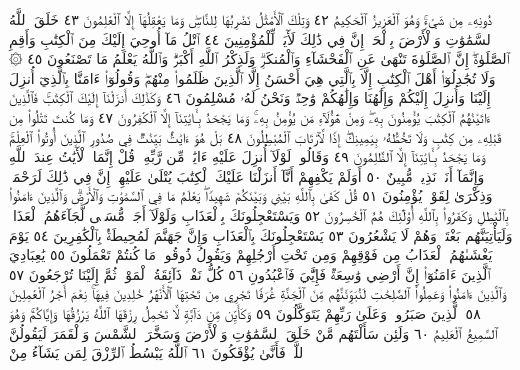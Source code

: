 دُونِهِۦ مِن شَيْءࣲۚ وَهُوَ ٱلْعَزِيزُ ٱلْحَكِيمُ ٤٢ وَتِلْكَ
ٱلْأَمْثَٰلُ نَضْرِبُهَا لِلنَّاسِۖ وَمَا يَعْقِلُهَآ إِلَّا ٱلْعَٰلِمُونَ ٤٣
خَلَقَ ٱللَّهُ ٱلسَّمَٰوَٰتِ وَٱلْأَرْضَ بِٱلْحَقِّۚ إِنَّ فِي ذَٰلِكَ
لَأٓيَةࣰ لِّلْمُؤْمِنِينَ ٤٤ ٱتْلُ مَآ أُوحِيَ إِلَيْكَ مِنَ ٱلْكِتَٰبِ
وَأَقِمِ ٱلصَّلَوٰةَۖ إِنَّ ٱلصَّلَوٰةَ تَنْهَىٰ عَنِ ٱلْفَحْشَآءِ
وَٱلْمُنكَرِۗ وَلَذِكْرُ ٱللَّهِ أَكْبَرُۗ وَٱللَّهُ يَعْلَمُ مَا تَصْنَعُونَ ٤٥
۞ وَلَا تُجَٰدِلُوٓا۟ أَهْلَ ٱلْكِتَٰبِ إِلَّا بِٱلَّتِي هِيَ أَحْسَنُ إِلَّا
ٱلَّذِينَ ظَلَمُوا۟ مِنْهُمْۖ وَقُولُوٓا۟ ءَامَنَّا بِٱلَّذِيٓ أُنزِلَ إِلَيْنَا وَأُنزِلَ
إِلَيْكُمْ وَإِلَٰهُنَا وَإِلَٰهُكُمْ وَٰحِدࣱ وَنَحْنُ لَهُۥ مُسْلِمُونَ ٤٦
وَكَذَٰلِكَ أَنزَلْنَآ إِلَيْكَ ٱلْكِتَٰبَۚ فَٱلَّذِينَ ءَاتَيْنَٰهُمُ
ٱلْكِتَٰبَ يُؤْمِنُونَ بِهِۦۖ وَمِنْ هَٰٓؤُلَآءِ مَن يُؤْمِنُ بِهِۦۚ وَمَا
يَجْحَدُ بِـَٔايَٰتِنَآ إِلَّا ٱلْكَٰفِرُونَ ٤٧ وَمَا كُنتَ تَتْلُوا۟ مِن
قَبْلِهِۦ مِن كِتَٰبࣲ وَلَا تَخُطُّهُۥ بِيَمِينِكَۖ إِذࣰا لَّٱرْتَابَ
ٱلْمُبْطِلُونَ ٤٨ بَلْ هُوَ ءَايَٰتُۢ بَيِّنَٰتࣱ فِي صُدُورِ ٱلَّذِينَ
أُوتُوا۟ ٱلْعِلْمَۚ وَمَا يَجْحَدُ بِـَٔايَٰتِنَآ إِلَّا ٱلظَّٰلِمُونَ ٤٩ وَقَالُوا۟
لَوْلَآ أُنزِلَ عَلَيْهِ ءَايَٰتࣱ مِّن رَّبِّهِۦۚ قُلْ إِنَّمَا ٱلْأٓيَٰتُ عِندَ ٱللَّهِ
وَإِنَّمَآ أَنَا۠ نَذِيرࣱ مُّبِينٌ ٥٠ أَوَلَمْ يَكْفِهِمْ أَنَّآ أَنزَلْنَا عَلَيْكَ
ٱلْكِتَٰبَ يُتْلَىٰ عَلَيْهِمْۚ إِنَّ فِي ذَٰلِكَ لَرَحْمَةࣰ وَذِكْرَىٰ
لِقَوْمࣲ يُؤْمِنُونَ ٥١ قُلْ كَفَىٰ بِٱللَّهِ بَيْنِي وَبَيْنَكُمْ
شَهِيدࣰاۖ يَعْلَمُ مَا فِي ٱلسَّمَٰوَٰتِ وَٱلْأَرْضِۗ وَٱلَّذِينَ ءَامَنُوا۟
بِٱلْبَٰطِلِ وَكَفَرُوا۟ بِٱللَّهِ أُو۟لَٰٓئِكَ هُمُ ٱلْخَٰسِرُونَ ٥٢
وَيَسْتَعْجِلُونَكَ بِٱلْعَذَابِ وَلَوْلَآ أَجَلࣱ مُّسَمࣰّى لَّجَآءَهُمُ ٱلْعَذَابُۚ
وَلَيَأْتِيَنَّهُم بَغْتَةࣰ وَهُمْ لَا يَشْعُرُونَ ٥٣ يَسْتَعْجِلُونَكَ بِٱلْعَذَابِ
وَإِنَّ جَهَنَّمَ لَمُحِيطَةُۢ بِٱلْكَٰفِرِينَ ٥٤ يَوْمَ يَغْشَىٰهُمُ ٱلْعَذَابُ
مِن فَوْقِهِمْ وَمِن تَحْتِ أَرْجُلِهِمْ وَيَقُولُ ذُوقُوا۟ مَا كُنتُمْ تَعْمَلُونَ ٥٥
يَٰعِبَادِيَ ٱلَّذِينَ ءَامَنُوٓا۟ إِنَّ أَرْضِي وَٰسِعَةࣱ فَإِيَّٰيَ فَٱعْبُدُونِ ٥٦
كُلُّ نَفْسࣲ ذَآئِقَةُ ٱلْمَوْتِۖ ثُمَّ إِلَيْنَا تُرْجَعُونَ ٥٧ وَٱلَّذِينَ
ءَامَنُوا۟ وَعَمِلُوا۟ ٱلصَّٰلِحَٰتِ لَنُبَوِّئَنَّهُم مِّنَ ٱلْجَنَّةِ غُرَفࣰا تَجْرِي
مِن تَحْتِهَا ٱلْأَنْهَٰرُ خَٰلِدِينَ فِيهَاۚ نِعْمَ أَجْرُ ٱلْعَٰمِلِينَ ٥٨ ٱلَّذِينَ
صَبَرُوا۟ وَعَلَىٰ رَبِّهِمْ يَتَوَكَّلُونَ ٥٩ وَكَأَيِّن مِّن دَآبَّةࣲ لَّا تَحْمِلُ
رِزْقَهَا ٱللَّهُ يَرْزُقُهَا وَإِيَّاكُمْۚ وَهُوَ ٱلسَّمِيعُ ٱلْعَلِيمُ ٦٠ وَلَئِن
سَأَلْتَهُم مَّنْ خَلَقَ ٱلسَّمَٰوَٰتِ وَٱلْأَرْضَ وَسَخَّرَ ٱلشَّمْسَ وَٱلْقَمَرَ
لَيَقُولُنَّ ٱللَّهُۖ فَأَنَّىٰ يُؤْفَكُونَ ٦١ ٱللَّهُ يَبْسُطُ ٱلرِّزْقَ لِمَن يَشَآءُ مِنْ
